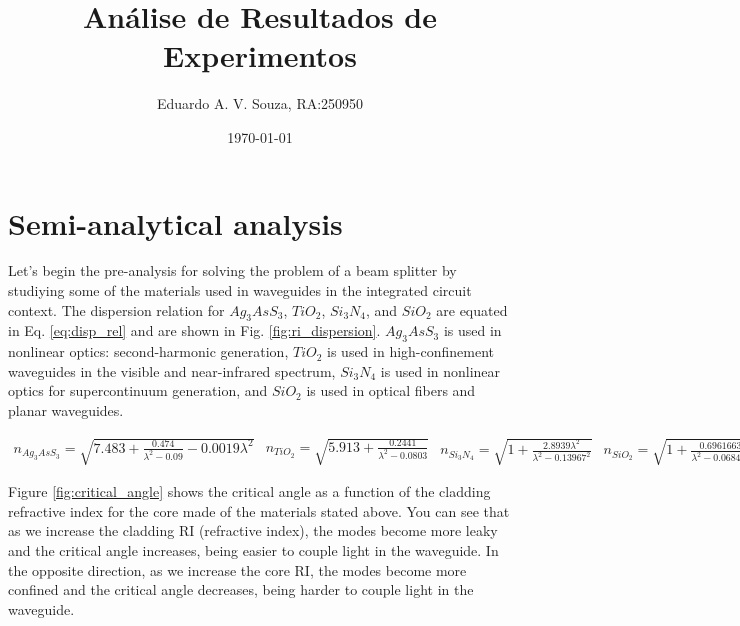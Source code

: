 \documentclass[a4paper,12pt]{article}
\title{Análise de Resultados de Experimentos}
\author{Eduardo A. V. Souza, RA:250950}
\date{\today}
\begin{document}
\maketitle

\section{Semi-analytical analysis}
\label{sec:semi_analytical}

Let's begin the pre-analysis for solving the problem of a beam splitter by studiying some of the materials used in waveguides in the integrated circuit context. The dispersion relation for $Ag_3AsS_3$, $TiO_2$, $Si_3N_4$, and $SiO_2$ are equated in Eq. \ref{eq:disp_rel} and are shown in Fig. \ref{fig:ri_dispersion}. $Ag_3AsS_3$ is used in nonlinear optics: second-harmonic generation, $TiO_2$ is used in high-confinement waveguides in the visible and near-infrared spectrum, $Si_3N_4$ is used in nonlinear optics for supercontinuum generation, and $SiO_2$ is used in optical fibers and planar waveguides.

\begin{subequations}
    \begin{align}
        n_{Ag_3AsS_3} = \sqrt{7.483 + \frac{0.474}{\lambda^2 - 0.09} - 0.0019 \lambda^2}
        \label{eq:ag3ass3_func}
    \end{align}
        
    \begin{align}
        n_{TiO_2} = \sqrt{5.913 + \frac{0.2441}{\lambda^2 - 0.0803}}
        \label{eq:tio2_func}
    \end{align}

    \begin{align}
        n_{Si_3N_4} = \sqrt{1 + \frac{2.8939 \lambda^2}{\lambda^2 - 0.13967^2}}
        \label{eq:si3n4_func}
    \end{align}

    \begin{align}
        n_{SiO_2} = \sqrt{1 + \frac{0.6961663 \lambda^2}{\lambda^2 - 0.0684043^2} + \frac{0.4079426 \lambda^2}{\lambda^2 - 0.1162414^2} + \frac{0.8974794 \lambda^2}{\lambda^2 - 9.896161}}
        \label{eq:sio2_func}
    \end{align}
\end{subequations}

Figure \ref{fig:critical_angle} shows the critical angle as a function of the cladding refractive index for the core made of the materials stated above. You can see that as we increase the cladding RI (refractive index), the modes become more leaky and the critical angle increases, being easier to couple light in the waveguide. In the opposite direction, as we increase the core RI, the modes become more confined and the critical angle decreases, being harder to couple light in the waveguide.
\end{document}
